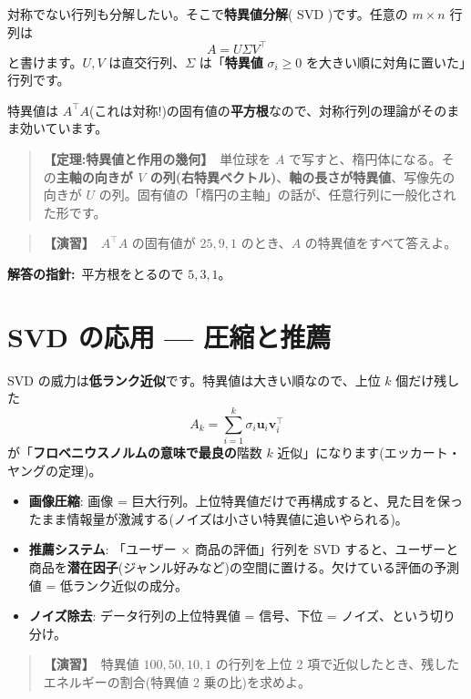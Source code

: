 \documentclass{article}
\begin{document}
対称でない行列も分解したい。そこで\textbf{特異値分解}( SVD )です。任意の \(m \times n\) 行列は
\[ A = U \Sigma V^{\top} \]
と書けます。\(U, V\) は直交行列、\(\Sigma\) は「\textbf{特異値} \(\sigma_i \ge 0\) を大きい順に対角に置いた」行列です。

特異値は \(A^{\top}A\)(これは対称!)の固有値の\textbf{平方根}なので、対称行列の理論がそのまま効いています。

\begin{quote}
\textbf{【定理:特異値と作用の幾何】}\ 単位球を \(A\) で写すと、楕円体になる。その\textbf{主軸の向きが \(V\) の列(右特異ベクトル)}、\textbf{軸の長さが特異値}、写像先の向きが \(U\) の列。固有値の「楕円の主軸」の話が、任意行列に一般化された形です。
\end{quote}

\begin{quote}
\textbf{【演習】}\ \(A^{\top}A\) の固有値が \(25, 9, 1\) のとき、\(A\) の特異値をすべて答えよ。
\end{quote}

\textbf{解答の指針:}\ 平方根をとるので \(5, 3, 1\)。

\section{SVD の応用 — 圧縮と推薦}

SVD の威力は\textbf{低ランク近似}です。特異値は大きい順なので、上位 \(k\) 個だけ残した
\[ A_k = \sum_{i=1}^{k} \sigma_i \boldsymbol{u}_i \boldsymbol{v}_i^{\top} \]
が「\textbf{フロベニウスノルムの意味で最良の}階数 \(k\) 近似」になります(エッカート・ヤングの定理)。

\begin{itemize}
\item \textbf{画像圧縮}: 画像 = 巨大行列。上位特異値だけで再構成すると、見た目を保ったまま情報量が激減する(ノイズは小さい特異値に追いやられる)。
\item \textbf{推薦システム}: 「ユーザー × 商品の評価」行列を SVD すると、ユーザーと商品を\textbf{潜在因子}(ジャンル好みなど)の空間に置ける。欠けている評価の予測値 = 低ランク近似の成分。
\item \textbf{ノイズ除去}: データ行列の上位特異値 = 信号、下位 = ノイズ、という切り分け。
\end{itemize}

\begin{quote}
\textbf{【演習】}\ 特異値 \(100, 50, 10, 1\) の行列を上位 2 項で近似したとき、残したエネルギーの割合(特異値 2 乗の比)を求めよ。
\end{quote}
\end{document}
